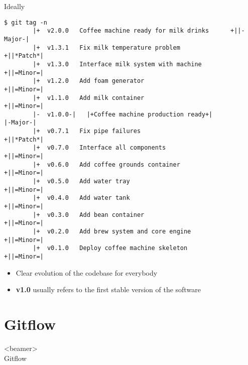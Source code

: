 \documentclass[usenames,svgnames,14pt]{beamer}
\begin{document}
\begin{frame}[fragile]{Ideally}
    \vspace{-2mm}
    \begin{lstlisting}[style=MyBash]
        $ git tag -n
        |+  v2.0.0   Coffee machine ready for milk drinks      +||-Major-|
        |+  v1.3.1   Fix milk temperature problem              +||*Patch*|
        |+  v1.3.0   Interface milk system with machine        +||=Minor=|
        |+  v1.2.0   Add foam generator                        +||=Minor=|
        |+  v1.1.0   Add milk container                        +||=Minor=|
        |-  v1.0.0-|   |+Coffee machine production ready+|           |-Major-|
        |+  v0.7.1   Fix pipe failures                         +||*Patch*|
        |+  v0.7.0   Interface all components                  +||=Minor=|
        |+  v0.6.0   Add coffee grounds container              +||=Minor=|
        |+  v0.5.0   Add water tray                            +||=Minor=|
        |+  v0.4.0   Add water tank                            +||=Minor=|
        |+  v0.3.0   Add bean container                        +||=Minor=|
        |+  v0.2.0   Add brew system and core engine           +||=Minor=|
        |+  v0.1.0   Deploy coffee machine skeleton            +||=Minor=|
    \end{lstlisting}
    \begin{itemize}
        \item Clear evolution of the codebase for everybody
        \item \textbf{v1.0} usually refers to the first stable version of the software
    \end{itemize}
\end{frame}




\section{Gitflow}
\begin{frame}<beamer>{\\ \colorbox{PP}{}\;Gitflow}
    \vspace{3mm}
    \tableofcontents[sections={5}, currentsection, currentsubsection, hideothersubsections, sectionstyle=hide]
\end{frame}
\end{document}

